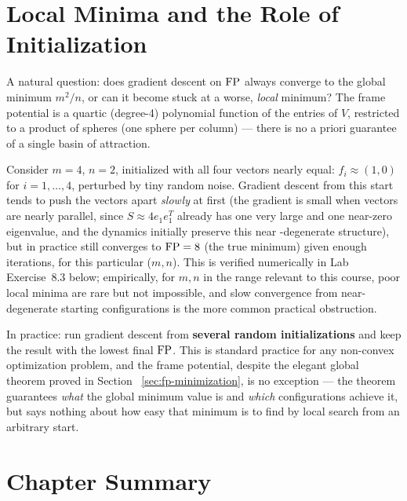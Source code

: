 \section{Local Minima and the Role of Initialization}
\label{sec:local-minima}

A natural question: does gradient descent on $\operatorname{FP}$ always converge to
the global minimum $m^2/n$, or can it become stuck at a worse,
\emph{local} minimum? The frame potential is a quartic (degree-4)
polynomial function of the entries of $V$, restricted to a product of
spheres (one sphere per column) --- there is no a priori guarantee of a
single basin of attraction.

\begin{examplebox}[title={Example 8.3: A bad initialization}]
\label{ex:fp-bad-init}
Consider $m=4$, $n=2$, initialized with all four vectors nearly equal:
$f_i\approx(1,0)$ for $i=1,\ldots,4$, perturbed by tiny random noise.
Gradient descent from this start tends to push the vectors apart
\emph{slowly} at first (the gradient is small when vectors are nearly
parallel, since $S\approx4e_1e_1^T$ already has one very large and one
near-zero eigenvalue, and the dynamics initially preserve this near
-degenerate structure), but in practice still converges to $\operatorname{FP}=8$
(the true minimum) given enough iterations, for this particular
($m,n$). This is verified numerically in Lab Exercise~8.3 below;
empirically, for $m,n$ in the range relevant to this course, poor local
minima are rare but not impossible, and slow convergence from
near-degenerate starting configurations is the more common practical
obstruction.
\end{examplebox}

\begin{keyidea}
In practice: run gradient descent from \textbf{several random
initializations} and keep the result with the lowest final $\operatorname{FP}$. This
is standard practice for any non-convex optimization problem, and the
frame potential, despite the elegant global theorem proved in Section~
\ref{sec:fp-minimization}, is no exception --- the theorem guarantees
\emph{what} the global minimum value is and \emph{which} configurations
achieve it, but says nothing about how easy that minimum is to find by
local search from an arbitrary start.
\end{keyidea}

\section{Chapter Summary}
\label{sec:summary-ch8}

